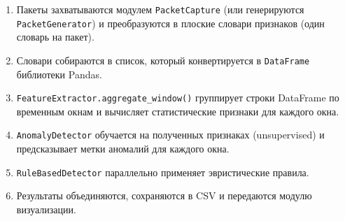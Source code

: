 \begin{enumerate}
    \item Пакеты захватываются модулем \texttt{PacketCapture} (или генерируются \texttt{PacketGenerator}) и преобразуются в плоские словари признаков (один словарь на пакет).
    \item Словари собираются в список, который конвертируется в \texttt{DataFrame} библиотеки Pandas.
    \item \texttt{FeatureExtractor.aggregate\_window()} группирует строки DataFrame по временным окнам и вычисляет статистические признаки для каждого окна.
    \item \texttt{AnomalyDetector} обучается на полученных признаках (unsupervised) и предсказывает метки аномалий для каждого окна.
    \item \texttt{RuleBasedDetector} параллельно применяет эвристические правила.
    \item Результаты объединяются, сохраняются в CSV и передаются модулю визуализации.
\end{enumerate}

